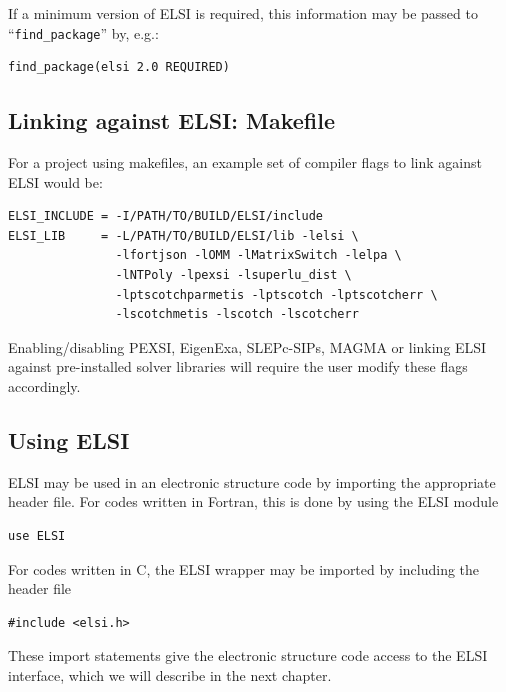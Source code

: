 \documentclass{report}
\begin{document}
If a minimum version of ELSI is required, this information may be passed to ``\verb+find_package+'' by, e.g.:
\begin{tcolorbox}
\begin{verbatim}
find_package(elsi 2.0 REQUIRED)
\end{verbatim}
\end{tcolorbox}

\subsection{Linking against ELSI: Makefile}
\label{subsec:import_makefile}
For a project using makefiles, an example set of compiler flags to link against ELSI would be:
\begin{tcolorbox}
\begin{verbatim}
ELSI_INCLUDE = -I/PATH/TO/BUILD/ELSI/include
ELSI_LIB     = -L/PATH/TO/BUILD/ELSI/lib -lelsi \
               -lfortjson -lOMM -lMatrixSwitch -lelpa \
               -lNTPoly -lpexsi -lsuperlu_dist \
               -lptscotchparmetis -lptscotch -lptscotcherr \
               -lscotchmetis -lscotch -lscotcherr
\end{verbatim}
\end{tcolorbox}

Enabling/disabling PEXSI, EigenExa, SLEPc-SIPs, MAGMA or linking ELSI against pre-installed solver libraries will require the user modify these flags accordingly.

\subsection{Using ELSI}
\label{subsec:import_use}
ELSI may be used in an electronic structure code by importing the appropriate header file. For codes written in Fortran, this is done by using the ELSI module
\begin{tcolorbox}
\begin{verbatim}
use ELSI
\end{verbatim}
\end{tcolorbox}

For codes written in C, the ELSI wrapper may be imported by including the header file
\begin{tcolorbox}
\begin{verbatim}
#include <elsi.h>
\end{verbatim}
\end{tcolorbox}

These import statements give the electronic structure code access to the ELSI interface, which we will describe in the next chapter.
\end{document}

